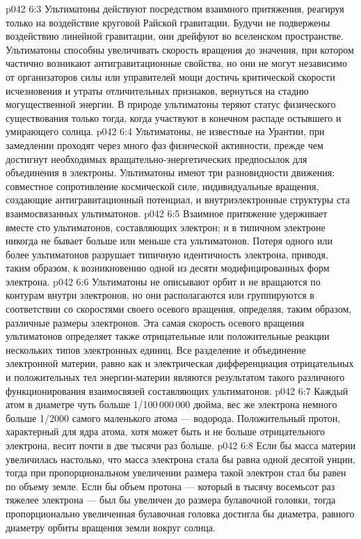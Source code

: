\vs p042 6:3 \pc Ультиматоны действуют посредством взаимного притяжения, реагируя только на воздействие круговой Райской гравитации. Будучи не подвержены воздействию линейной гравитации, они дрейфуют во вселенском пространстве. Ультиматоны способны увеличивать скорость вращения до значения, при котором частично возникают антигравитационные свойства, но они не могут независимо от организаторов силы или управителей мощи достичь критической скорости исчезновения и утраты отличительных признаков, вернуться на стадию могущественной энергии. В природе ультиматоны теряют статус физического существования только тогда, когда участвуют в конечном распаде остывшего и умирающего солнца.
\vs p042 6:4 \pc Ультиматоны, не известные на Урантии, при замедлении проходят через много фаз физической активности, прежде чем достигнут необходимых вращательно\hyp{}энергетических предпосылок для объединения в электроны. Ультиматоны имеют три разновидности движения: совместное сопротивление космической силе, индивидуальные вращения, создающие антигравитационный потенциал, и внутриэлектронные структуры ста взаимосвязанных ультиматонов.
\vs p042 6:5 Взаимное притяжение удерживает вместе сто ультиматонов, составляющих электрон; и в типичном электроне никогда не бывает больше или меньше ста ультиматонов. Потеря одного или более ультиматонов разрушает типичную идентичность электрона, приводя, таким образом, к возникновению одной из десяти модифицированных форм электрона.
\vs p042 6:6 Ультиматоны не описывают орбит и не вращаются по контурам внутри электронов, но они располагаются или группируются в соответствии со скоростями своего осевого вращения, определяя, таким образом, различные размеры электронов. Эта самая скорость осевого вращения ультиматонов определяет также отрицательные или положительные реакции нескольких типов электронных единиц. Все разделение и объединение электронной материи, равно как и электрическая дифференциация отрицательных и положительных тел энергии\hyp{}материи являются результатом такого различного функционирования взаимосвязей составляющих ультиматонов.
\vs p042 6:7 \pc Каждый атом в диаметре чуть больше 1/100\,000\,000 дюйма, вес же электрона немного больше 1/2000 самого маленького атома --- водорода. Положительный протон, характерный для ядра атома, хотя может быть и не больше отрицательного электрона, весит почти в две тысячи раз больше.
\vs p042 6:8 \pc Если бы масса материи увеличилась настолько, что масса электрона стала бы равна одной десятой унции, тогда при пропорциональном увеличении размера такой электрон стал бы равен по объему земле. Если бы объем протона --- который в тысячу восемьсот раз тяжелее электрона --- был бы увеличен до размера булавочной головки, тогда пропорционально увеличенная булавочная головка достигла бы диаметра, равного диаметру орбиты вращения земли вокруг солнца.
